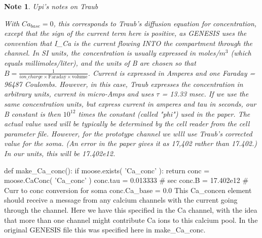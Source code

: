 \documentclass[]{article}%
\newtheorem{note}{Note}
\begin{document}
\begin{note}{Upi's notes on Traub}

  With $Ca_{base} = 0$, this corresponds to Traub's diffusion equation for
  concentration, except that the sign of the current term here is positive, as
  GENESIS uses the convention that {\Tt{}I{\_}Ca\nwendquote} is the current flowing INTO the
  compartment through the channel.  In SI units, the concentration is usually
  expressed in {\Tt{}moles\nwendquote}/$m^3$ (which equals {\Tt{}millimoles/liter\nwendquote}), and the
  units of B are chosen so that $B = \frac{1}{ion\_charge \times \text{Faraday}
  \times \text{volume}}$. Current is expressed in {\Tt{}Amperes\nwendquote} and one
  {\Tt{}Faraday\nwendquote} = 96487 {\Tt{}Coulombs\nwendquote}.  However, in this case, Traub expresses the
  concentration in arbitrary units, current in {\Tt{}micro-Amps\nwendquote} and uses $\tau$ =
  13.33 msec.  If we use the same concentration units, but express current in
  amperes and tau in seconds, our B constant is then $10^{12}$ times the constant
  (called "phi") used in the paper.  The actual value used will be typically be
  determined by the cell reader from the cell parameter file.  However, for the
  prototype channel we wlll use Traub's corrected value for the soma.  (An error
  in the paper gives it as 17,402 rather than 17.402.)  In our units, this will
  be 17.402e12.

\end{note}

\nwenddocs{}\endmoddef\nwstartdeflinemarkup{}\nwenddeflinemarkup
def make_Ca_conc():
  if moose.exists( 'Ca_conc' ):
    return
  conc = moose.CaConc( 'Ca_conc' )
  conc.tau = 0.013333  # sec
  conc.B  = 17.402e12 # Curr to conc conversion for soma
  conc.Ca_base = 0.0
\eatline
{}\nwendcode{}\nwdocspar
This {\Tt{}Ca{\_}concen\nwendquote} element should receive a message from any calcium channels with
the current going through the channel. Here we have this specified in the Ca
channel, with the idea that more than one channel might contribute Ca ions to
this calcium pool. In the original GENESIS file this was specified here in
{\Tt{}make{\_}Ca{\_}conc\nwendquote}.
\end{document}
